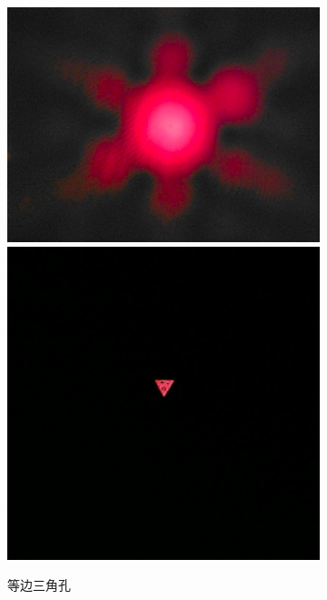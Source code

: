 \documentclass[a4paper]{article}
\begin{document}
\begin{figure}[htbp]
\begin{subfigure}[htbp]{0.3\textwidth}
        \centering
        \includegraphics[width=\textwidth]{fre-done/2-2.JPG}
        \includegraphics[width=\textwidth]{img-done/2-2.JPG}
        \caption{等边三角孔}
        \label{2-2}
    \end{subfigure}
    \begin{subfigure}[htbp]{0.3\textwidth}
        \centering

\end{subfigure}
\end{figure}
\end{document}
